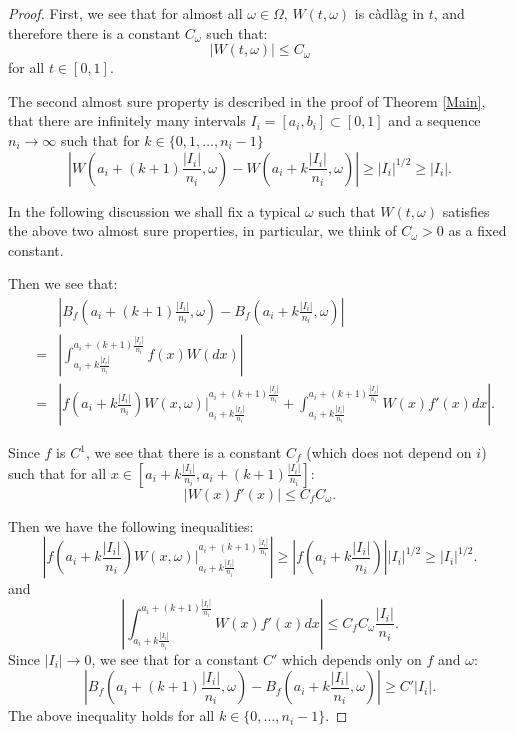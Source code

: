 \begin{proof}
	First, we see that for almost all $\omega\in\Omega$, $W(t,\omega)$ is c\`adl\`ag in $t$, and therefore there is a constant $C_\omega$ such that:
	\[
	|W(t,\omega)|\leq C_\omega
	\]
	for all $t\in [0,1]$. 
	
	The second almost sure property is described in the proof of Theorem \ref{Main}, that there are infinitely many intervals $I_i=[a_i,b_i]\subset [0,1]$ and a sequence $n_i\to\infty$ such that for $k\in\{0,1,\dots,n_i-1\}$
	\[
	\left|W\left(a_i+(k+1)\frac{|I_i|}{n_i},\omega\right)-W\left(a_i+k\frac{|I_i|}{n_i},\omega\right)\right|\geq |I_i|^{1/2}\geq |I_i|.
	\]
	
	In the following discussion we shall fix a typical $\omega$ such that $W(t,\omega)$ satisfies the above two almost sure properties, in particular, we think of $C_\omega>0$ as a fixed constant.
	
	Then we see that:
	\begin{eqnarray*}
		& &\left|B_f\left(a_i+(k+1)\frac{|I_i|}{n_i},\omega\right)-B_f\left(a_i+k\frac{|I_i|}{n_i},\omega\right)\right|\\
		&=& \left| \int_{a_i+k\frac{|I_i|}{n_i}}^{a_i+(k+1)\frac{|I_i|}{n_i}} f(x)W(dx)\right|\\
		&=& \left| f\left(a_i+k\frac{|I_i|}{n_i}\right)W(x,\omega)\bigg\vert_{a_i+k\frac{|I_i|}{n_i}}^{a_i+(k+1)\frac{|I_i|}{n_i}} + \int_{a_i+k\frac{|I_i|}{n_i}}^{a_i+(k+1)\frac{|I_i|}{n_i}} W(x)f'(x)dx \right|.
	\end{eqnarray*}
	
	Since $f$ is $C^1$, we see that there is a constant $C_f$ (which does not depend on $i$) such that for all $x\in \left[{a_i+k\frac{|I_i|}{n_i}},{a_i+(k+1)\frac{|I_i|}{n_i}}\right]$:
	\[
	\left\vert W(x)f'(x)\right\vert \leq C_f C_\omega.
	\]
	
	Then we have the following inequalities:
	\[
	\left| f\left(a_i+k\frac{|I_i|}{n_i}\right)W(x,\omega)\bigg\vert_{a_i+k\frac{|I_i|}{n_i}}^{a_i+(k+1)\frac{|I_i|}{n_i}} \right| \geq \left| f\left(a_i+k\frac{|I_i|}{n_i}\right) \right| |I_i|^{1/2}\geq |I_i|^{1/2}.\tag{**}
	\]
	and
	\[
	\left\vert\int_{a_i+k\frac{|I_i|}{n_i}}^{a_i+(k+1)\frac{|I_i|}{n_i}} W(x)f'(x)dx \right\vert\leq C_fC_\omega\frac{|I_i|}{n_i}.
	\]
	Since $|I_i|\to 0$,  we see that for a constant $C'$ which depends only on $f$ and $\omega$:
	\[
	\left|B_f\left(a_i+(k+1)\frac{|I_i|}{n_i},\omega\right)-B_f\left(a_i+k\frac{|I_i|}{n_i},\omega\right)\right|\geq C'|I_i|.\tag{***}
	\]
	The above inequality holds for all $k\in\{0,\dots,n_i-1\}$. 
	

\end{proof}

